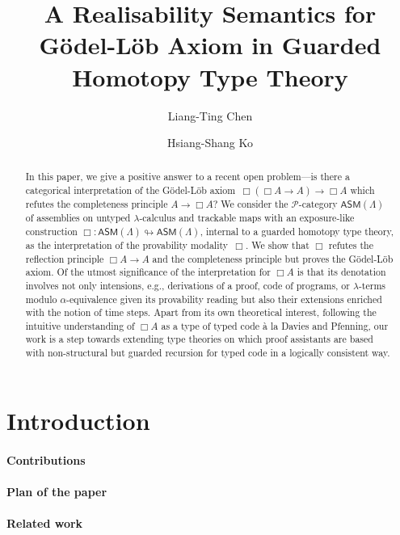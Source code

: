 \documentclass[a4paper,UKenglish,numberwithinsect,cleveref,thm-restate]{lipics-v2021}
\title{A Realisability Semantics for Gödel-Löb Axiom in Guarded Homotopy Type Theory}
\author{Liang-Ting Chen}%
  {Institute of Information Science, Academia Sinica, Taiwan~\url{https://l-tchen.github.io}}%
  {liang.ting.chen.tw@gmail.com}%
  {https://orcid.org/0000-0002-3250-1331}{}
\author{Hsiang-Shang Ko}%
  {Institute of Information Science, Academia Sinica, Taiwan~\url{https://josh-hs-ko.github.io}}%
  {joshko@iis.sinica.edu.tw}%
  {https://orcid.org/0000-0002-2439-1048}{}
\newcommand{\PP}{\mathscr{P}}
\newcommand{\ASM}{\mathsf{ASM}}
\theoremstyle{plain}
\begin{document}
\maketitle

\begin{abstract}
  In this paper, we give a positive answer to a recent open problem---is there a categorical interpretation of the Gödel-Löb axiom~$\Box (\Box A \to A) \to \Box A$ which refutes the completeness principle $A \to \Box A$?
  We consider the $\PP$-category $\ASM(\Lambda)$ of assemblies on untyped $\lambda$-calculus and trackable maps with an exposure-like construction $\Box\colon \ASM(\Lambda) \looparrowright \ASM(\Lambda)$, internal to a guarded homotopy type theory, as the interpretation of the provability modality~$\Box$.
  We show that $\Box$ refutes the reflection principle $\Box A \to A$ and the completeness principle but proves the Gödel-Löb axiom.
  Of the utmost significance of the interpretation for $\Box A$ is that its denotation involves not only intensions, e.g., derivations of a proof, code of programs, or $\lambda$-terms modulo $\alpha$-equivalence given its provability reading but also their extensions enriched with the notion of time steps. 
  Apart from its own theoretical interest, following the intuitive understanding of $\Box A$ as a type of typed code \`a la Davies and Pfenning, our work is a step towards extending type theories on which proof assistants are based with non-structural but guarded recursion for typed code in a logically consistent way.
\end{abstract}

\section{Introduction}\label{sec:intro}
\cite{Litak2014}
\cite{Davies2001b}

\paragraph*{Contributions}

\paragraph*{Plan of the paper}

\paragraph*{Related work}
\cite{Visser2019,Beklemishev2006}
\cite{Kavvos2020}
\cite{Shamkanov2014,Shamkanov2016a}
\end{document}
